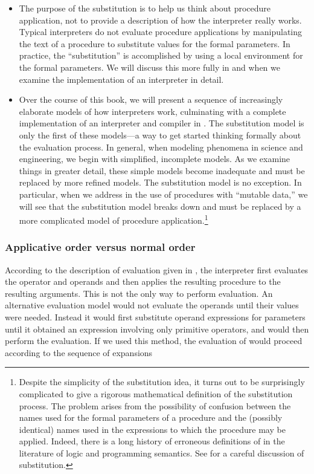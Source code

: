 \begin{itemize}
\item
The purpose of the substitution is to help us think about procedure
application, not to provide a description of how the interpreter really works.
Typical interpreters do not evaluate procedure applications by manipulating the
text of a procedure to substitute values for the formal parameters. In
practice, the ``substitution'' is accomplished by using a local environment for
the formal parameters.  We will discuss this more fully in  and
 when we examine the implementation of an interpreter in detail.

\item
Over the course of this book, we will present a sequence of increasingly
elaborate models of how interpreters work, culminating with a complete
implementation of an interpreter and compiler in . The
substitution model is only the first of these models---a way to get started
thinking formally about the evaluation process. In general, when modeling
phenomena in science and engineering, we begin with simplified, incomplete
models. As we examine things in greater detail, these simple models become
inadequate and must be replaced by more refined models. The substitution model
is no exception. In particular, when we address in  the use of
procedures with ``mutable data,'' we will see that the substitution model
breaks down and must be replaced by a more complicated model of procedure
application.\footnote{Despite the simplicity of the substitution idea, it turns
out to be surprisingly complicated to give a rigorous mathematical definition
of the substitution process. The problem arises from the possibility of
confusion between the names used for the formal parameters of a procedure and
the (possibly identical) names used in the expressions to which the procedure
may be applied. Indeed, there is a long history of erroneous definitions of
 in the literature of logic and programming semantics.
See  for a careful discussion of substitution.}
\end{itemize}

\subsubsection*{Applicative order versus normal order}

According to the description of evaluation given in , the
interpreter first evaluates the operator and operands and then applies the
resulting procedure to the resulting arguments.  This is not the only way to
perform evaluation.  An alternative evaluation model would not evaluate the
operands until their values were needed.  Instead it would first substitute
operand expressions for parameters until it obtained an expression involving
only primitive operators, and would then perform the evaluation.  If we used
this method, the evaluation of  would proceed according to the
sequence of expansions

